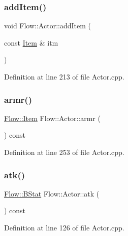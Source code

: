 \subsubsection{\texorpdfstring{add\+Item()}{addItem()}}
{\footnotesize\ttfamily void Flow\+::\+Actor\+::add\+Item (\begin{DoxyParamCaption}\item[{const \hyperlink{class_flow_1_1_item}{Item} \&}]{itm }\end{DoxyParamCaption})}



Definition at line 213 of file Actor.\+cpp.

\hypertarget{class_flow_1_1_actor_a7bb72f8323d7023e3ccac777a25e0966}{}\label{class_flow_1_1_actor_a7bb72f8323d7023e3ccac777a25e0966} 
\subsubsection{\texorpdfstring{armr()}{armr()}}
{\footnotesize\ttfamily \hyperlink{class_flow_1_1_item}{Flow\+::\+Item} Flow\+::\+Actor\+::armr (\begin{DoxyParamCaption}{ }\end{DoxyParamCaption}) const}



Definition at line 253 of file Actor.\+cpp.

\hypertarget{class_flow_1_1_actor_ac78ab3e662afc0b9e2b49c5627fbee6f}{}\label{class_flow_1_1_actor_ac78ab3e662afc0b9e2b49c5627fbee6f} 
\subsubsection{\texorpdfstring{atk()}{atk()}}
{\footnotesize\ttfamily \hyperlink{class_flow_1_1_b_stat}{Flow\+::\+B\+Stat} Flow\+::\+Actor\+::atk (\begin{DoxyParamCaption}{ }\end{DoxyParamCaption}) const}



Definition at line 126 of file Actor.\+cpp.

\hypertarget{class_flow_1_1_actor_a37e4e24d0896e55da37ff88483b2e302}{}\label{class_flow_1_1_actor_a37e4e24d0896e55da37ff88483b2e302} 
